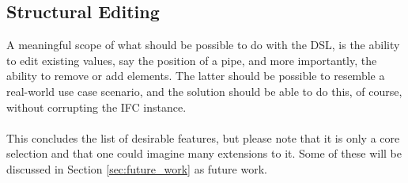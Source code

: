 \subsection{Structural Editing}
A meaningful scope of what should be possible to do with the DSL, is the ability to edit existing values, say the position of a pipe, and more importantly, the ability to remove or add elements. The latter should be possible to resemble a real-world use case scenario, and the solution should be able to do this, of course, without corrupting the IFC instance.
\paragraph{}
This concludes the list of desirable features, but please note that it is only a core selection and that one could imagine many extensions to it. Some of these will be discussed in Section \ref{sec:future_work} as future work. 

